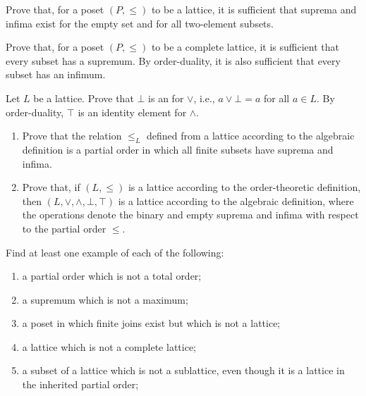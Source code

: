 \exercises
\begin{exercise}\label{exe:lattsuff}
Prove that, for a poset $(P,\leq)$ to be a lattice, it is sufficient that suprema and infima exist for the empty set and for all two-element subsets.
\end{exercise}
\begin{exercise}\label{exe:complattsuff}
Prove that, for a poset $(P,\leq)$ to be a complete lattice, it is sufficient that every subset has a supremum. By order-duality, it is also sufficient that every subset has an infimum.
\end{exercise}
\begin{exercise}
Let $L$ be a lattice. Prove that $\bot$ is an  for $\vee$, i.e., $a \vee \bot = a$ for all $a \in L$. By order-duality, $\top$ is an identity element for $\wedge$.
\end{exercise}
\begin{exercise}\label{exe:latticedefs}
\begin{enumerate}
\item Prove that the relation $\leq_L$ defined from a lattice according to the algebraic definition is a partial order in which all finite subsets have suprema and infima. 
\item Prove that, if $(L,\leq)$ is a lattice according to the order-theoretic definition, then $(L,\vee,\wedge,\bot,\top)$ is a lattice according to the algebraic definition, where the operations denote the binary and empty suprema and infima with respect to the partial order $\leq$.
\end{enumerate}
\end{exercise}
\begin{exercise}\label{exe:easy-counterexamples}
Find at least one example of each of the following:
\begin{enumerate}
\item a partial order which is not a total order;
\item a supremum which is not a maximum;
\item a poset in which finite joins exist but which is not a lattice;
\item a lattice which is not a complete lattice;
\item a subset of a lattice which is not a sublattice, even though it is a lattice in the inherited partial order;
\end{enumerate}
\end{exercise}
